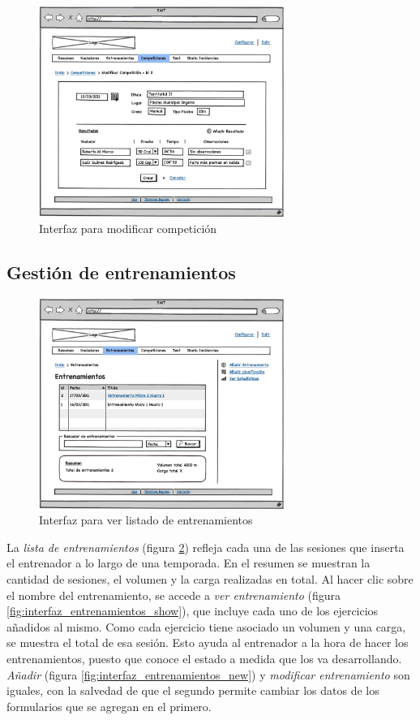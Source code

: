 		\begin{figure}[H]
		  \centering
		    \includegraphics[width=8cm]{./eps/17_Competiciones_modif.eps}
		  \caption{Interfaz para modificar competición}
		  \label{fig:interfaz_competiciones_modif}
		\end{figure}
	
	\subsection{Gestión de entrenamientos} %
		\label{sub:gestion_de_entrenamientos}
	
		\begin{figure}[H]
		  \centering
		    \includegraphics[width=8cm]{./eps/18_Entrenamientos.eps}
		  \caption{Interfaz para ver listado de entrenamientos}
		  \label{fig:interfaz_entrenamientos}
		\end{figure}
		
	La {\it lista de entrenamientos} (figura \ref{fig:interfaz_entrenamientos}) refleja cada una de las sesiones que inserta el entrenador a lo largo de una temporada. En el resumen se muestran la cantidad de sesiones, el volumen y la carga realizadas en total. Al hacer clic sobre el nombre del entrenamiento, se accede a {\it ver entrenamiento} (figura \ref{fig:interfaz_entrenamientos_show}), que incluye cada uno de los ejercicios añadidos al mismo. Como cada ejercicio tiene asociado un volumen y una carga, se muestra el total de esa sesión. Esto ayuda al entrenador a la hora de hacer los entrenamientos, puesto que conoce el estado a medida que los va desarrollando.\\
	\newline
	{\it Añadir} (figura \ref{fig:interfaz_entrenamientos_new}) y {\it modificar entrenamiento} son iguales, con la salvedad de que el segundo permite cambiar los datos de los formularios que se agregan en el primero.

